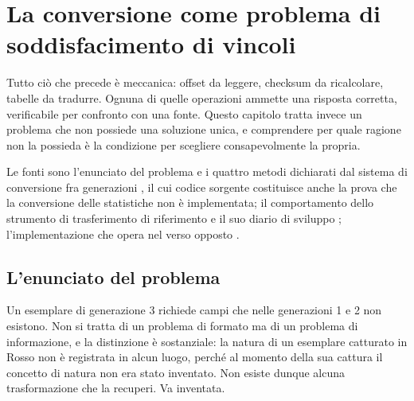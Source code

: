 
\chapter{La conversione come problema di soddisfacimento di vincoli}
\label{cap:conversione}

Tutto ciò che precede è meccanica: offset da leggere, checksum da ricalcolare, tabelle da tradurre. Ognuna di quelle operazioni ammette una risposta corretta, verificabile per confronto con una fonte. Questo capitolo tratta invece un problema che non possiede una soluzione unica, e comprendere per quale ragione non la possieda è la condizione per scegliere consapevolmente la propria.

Le fonti sono l'enunciato del problema e i quattro metodi dichiarati dal sistema di conversione fra generazioni \cite{pccs}, il cui codice sorgente costituisce anche la prova che la conversione delle statistiche non è implementata; il comportamento dello strumento di trasferimento di riferimento \cite{ptgb} e il suo diario di sviluppo \cite{devlog-ptgb}; l'implementazione che opera nel verso opposto \cite{gen3togenx}.

\section{L'enunciato del problema}

Un esemplare di generazione 3 richiede campi che nelle generazioni 1 e 2 non esistono. Non si tratta di un problema di formato ma di un problema di informazione, e la distinzione è sostanziale: la natura di un esemplare catturato in Rosso non è registrata in alcun luogo, perché al momento della sua cattura il concetto di natura non era stato inventato. Non esiste dunque alcuna trasformazione che la recuperi. Va inventata.

